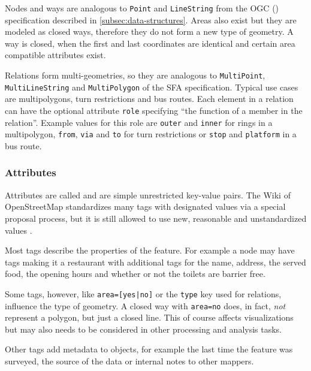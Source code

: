 			Nodes and ways are analogous to \texttt{Point} and \texttt{LineString} from the OGC  () specification described in \cref{subsec:data-structures}.
			Areas also exist but they are modeled as closed ways, therefore they do not form a new type of geometry.
			A way is closed, when the first and last coordinates are identical and certain area compatible attributes exist.
			
			Relations form multi-geometries, so they are analogous to \texttt{MultiPoint}, \texttt{MultiLineString} and \texttt{MultiPolygon} of the SFA specification.
			Typical use cases are multipolygons, turn restrictions and bus routes.
			Each element in a relation can have the optional attribute \texttt{role} specifying \enquote{the function of a member in the relation}\cite{osm-wiki-relation}.
			Example values for this role are \texttt{outer} and \texttt{inner} for rings in a multipolygon, \texttt{from}, \texttt{via} and \texttt{to} for turn restrictions or \texttt{stop} and \texttt{platform} in a bus route.
			
		\subsubsection{Attributes}
		\label{subsubsec:osm-attributes}
			
			Attributes are called  and are simple unrestricted key-value pairs.
			The Wiki of OpenStreetMap standardizes many tags with designated values via a special proposal process, but it is still allowed to use new, reasonable and unstandardized values \cite{osm-wiki-proposal-process}.
			
			Most tags describe the properties of the feature.
			For example a node may have tags making it a restaurant with additional tags for the name, address, the served food, the opening hours and whether or not the toilets are barrier free.
			
			Some tags, however, like \texttt{area=[yes|no]} or the \texttt{type} key used for relations, influence the type of geometry.
			A closed way with \texttt{area=no} does, in fact, \textit{not} represent a polygon, but just a closed line.
			This of course affects visualizations but may also needs to be considered in other processing and analysis tasks.
			
			Other tags add metadata to objects, for example the last time the feature was surveyed, the source of the data or internal notes to other mappers.
			
